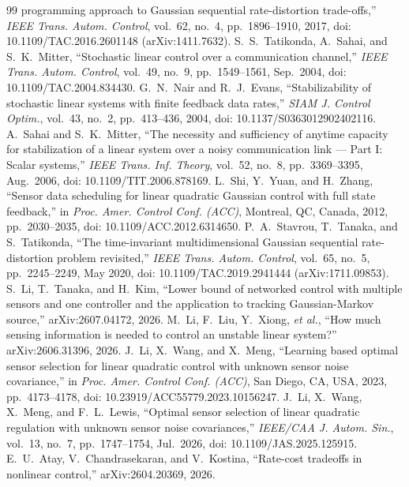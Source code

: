 \begin{thebibliography}{99}
programming approach to Gaussian sequential rate-distortion trade-offs,''
\emph{IEEE Trans. Autom. Control}, vol.~62, no.~4, pp.~1896--1910, 2017,
doi: 10.1109/TAC.2016.2601148 (arXiv:1411.7632).
S.~S.~Tatikonda, A.~Sahai, and S.~K.~Mitter, ``Stochastic linear control over a
communication channel,'' \emph{IEEE Trans. Autom. Control}, vol.~49, no.~9,
pp.~1549--1561, Sep.~2004, doi: 10.1109/TAC.2004.834430.
G.~N.~Nair and R.~J.~Evans, ``Stabilizability of stochastic linear systems with
finite feedback data rates,'' \emph{SIAM J. Control Optim.}, vol.~43, no.~2,
pp.~413--436, 2004, doi: 10.1137/S0363012902402116.
A.~Sahai and S.~K.~Mitter, ``The necessity and sufficiency of anytime capacity for
stabilization of a linear system over a noisy communication link --- Part I: Scalar
systems,'' \emph{IEEE Trans. Inf. Theory}, vol.~52, no.~8, pp.~3369--3395,
Aug.~2006, doi: 10.1109/TIT.2006.878169.
L.~Shi, Y.~Yuan, and H.~Zhang, ``Sensor data scheduling for linear quadratic
Gaussian control with full state feedback,'' in \emph{Proc. Amer. Control Conf.
(ACC)}, Montreal, QC, Canada, 2012, pp.~2030--2035, doi: 10.1109/ACC.2012.6314650.
P.~A.~Stavrou, T.~Tanaka, and S.~Tatikonda, ``The time-invariant multidimensional
Gaussian sequential rate-distortion problem revisited,'' \emph{IEEE Trans. Autom.
Control}, vol.~65, no.~5, pp.~2245--2249, May 2020, doi: 10.1109/TAC.2019.2941444
(arXiv:1711.09853).
S.~Li, T.~Tanaka, and H.~Kim, ``Lower bound of networked control with multiple
sensors and one controller and the application to tracking Gaussian-Markov
source,'' arXiv:2607.04172, 2026.
M.~Li, F.~Liu, Y.~Xiong, \emph{et al.}, ``How much sensing information is needed
to control an unstable linear system?'' arXiv:2606.31396, 2026.
J.~Li, X.~Wang, and X.~Meng, ``Learning based optimal sensor selection for linear
quadratic control with unknown sensor noise covariance,'' in \emph{Proc. Amer.
Control Conf. (ACC)}, San Diego, CA, USA, 2023, pp.~4173--4178, doi:
10.23919/ACC55779.2023.10156247.
J.~Li, X.~Wang, X.~Meng, and F.~L.~Lewis, ``Optimal sensor selection of linear
quadratic regulation with unknown sensor noise covariances,'' \emph{IEEE/CAA J.
Autom. Sin.}, vol.~13, no.~7, pp.~1747--1754, Jul.~2026, doi: 10.1109/JAS.2025.125915.
E.~U.~Atay, V.~Chandrasekaran, and V.~Kostina, ``Rate-cost tradeoffs in nonlinear
control,'' arXiv:2604.20369, 2026.

\end{thebibliography}
